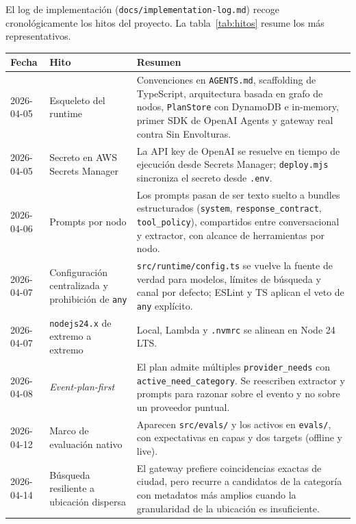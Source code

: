 \documentclass[11pt,a4paper]{article}
\begin{document}
El log de implementación (\texttt{docs/implementation-log.md}) recoge
cronológicamente los hitos del proyecto. La tabla~\ref{tab:hitos}
resume los más representativos.

\begin{longtable}{p{2.4cm}p{4.0cm}p{9.0cm}}
\toprule
\textbf{Fecha} & \textbf{Hito} & \textbf{Resumen} \\
\midrule
\endhead

2026-04-05 & Esqueleto del runtime &
Convenciones en \texttt{AGENTS.md}, scaffolding de TypeScript,
arquitectura basada en grafo de nodos, \texttt{PlanStore} con
DynamoDB e in-memory, primer SDK de OpenAI Agents y gateway real
contra Sin Envolturas. \\

2026-04-05 & Secreto en AWS Secrets Manager &
La API key de OpenAI se resuelve en tiempo de ejecución desde
Secrets Manager; \texttt{deploy.mjs} sincroniza el secreto desde
\texttt{.env}. \\

2026-04-06 & Prompts por nodo &
Los prompts pasan de ser texto suelto a bundles estructurados
(\texttt{system}, \texttt{response\_contract}, \texttt{tool\_policy}),
compartidos entre conversacional y extractor, con alcance de
herramientas por nodo. \\

2026-04-07 & Configuración centralizada y prohibición de \texttt{any} &
\texttt{src/runtime/config.ts} se vuelve la fuente de verdad para
modelos, límites de búsqueda y canal por defecto; ESLint y TS
aplican el veto de \texttt{any} explícito. \\

2026-04-07 & \texttt{nodejs24.x} de extremo a extremo &
Local, Lambda y \texttt{.nvmrc} se alinean en Node 24 LTS. \\

2026-04-08 & \emph{Event-plan-first} &
El plan admite múltiples \texttt{provider\_needs} con
\texttt{active\_need\_category}. Se reescriben extractor y prompts
para razonar sobre el evento y no sobre un proveedor puntual. \\

2026-04-12 & Marco de evaluación nativo &
Aparecen \texttt{src/evals/} y los activos en \texttt{evals/}, con
expectativas en capas y dos targets (offline y live). \\

2026-04-14 & Búsqueda resiliente a ubicación dispersa &
El gateway prefiere coincidencias exactas de ciudad, pero recurre a
candidatos de la categoría con metadatos más amplios cuando la
granularidad de la ubicación es insuficiente. \\


\end{longtable}
\end{document}
